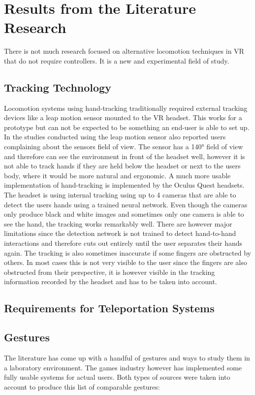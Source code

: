 \chapter{Results from the Literature Research}

There is not much research focused on alternative locomotion techniques in VR that do not require controllers. It is a new and experimental field of study.

\section{Tracking Technology}
Locomotion systems using hand-tracking traditionally required external tracking devices like a leap motion sensor mounted to the VR headset. %
This works for a prototype but can not be expected to be something an end-user is able to set up. In the studies conducted using the leap motion sensor also reported users complaining about the sensors field of view. %
The sensor has a 140° field of view and therefore can see the environment in front of the headset well, however it is not able to track hands if they are held below the headset or next to the users body, where it would be more natural and ergonomic. A much more usable implementation of hand-tracking is implemented by the Oculus Quest headsets. %
The headset is using internal tracking using up to 4 cameras that are able to detect the users hands using a trained neural network. %
Even though the cameras only produce black and white images and sometimes only one camera is able to see the hand, the tracking works remarkably well. There are however major limitations since the detection network is not trained to detect hand-to-hand interactions and therefore cuts out entirely until the user separates their hands again. The tracking is also sometimes inaccurate if some fingers are obstructed by others. In most cases this is not very visible to the user since the fingers are also obstructed from their perspective, it is however visible in the tracking information recorded by the headset and has to be taken into account. 

\section{Requirements for Teleportation Systems}

\section{Gestures}
The literature has come up with a handful of gestures and ways to study them in a laboratory environment. The games industry however has implemented some fully usable systems for actual users. Both types of sources were taken into account to produce this list of comparable gestures:

